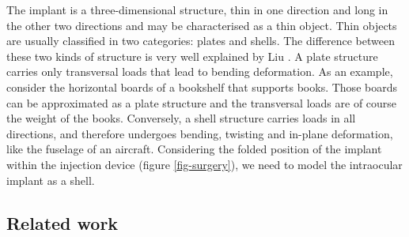 \documentclass{llncs}
\begin{document}
The implant is a three-dimensional structure, thin in one direction and long in the other two directions and may be characterised as a thin object. Thin objects are usually classified in two categories: plates and shells. The difference between these two kinds of structure is very well explained by Liu \cite{Liu03}. A plate structure carries only transversal loads that lead to bending deformation. As an example, consider the horizontal boards of a bookshelf that supports books. Those boards can be approximated as a plate structure and the transversal loads are of course the weight of the books. Conversely, a shell structure carries loads in all directions, and therefore undergoes bending, twisting and in-plane deformation, like the fuselage of an aircraft. Considering the folded position of the implant within the injection device (figure \ref{fig-surgery}), we need to model the intraocular implant as a shell. 


\subsection{Related work}
\end{document}
